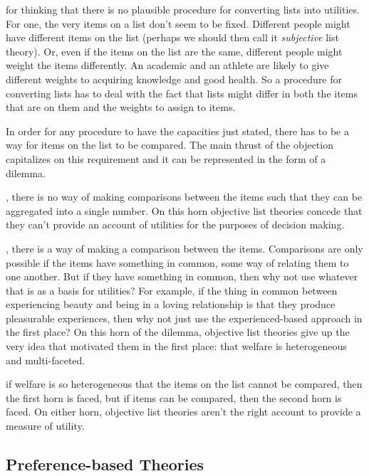 \documentclass[]{tufte-book}
\begin{document}
 for thinking that there is no plausible procedure for converting lists into utilities. For one, the very items on a list don't seem to be fixed. Different people might have different items on the list (perhaps we should then call it \emph{subjective} list theory). Or, even if the items on the list are the same, different people might weight the items differently. An academic and an athlete are likely to give different weights to acquiring knowledge and good health. So a procedure for converting lists has to deal with the fact that lists might differ in both the items that are on them and the weights to assign to items.

In order for any procedure to have the capacities just stated, there has to be a way for items on the list to be compared. The main thrust of the objection capitalizes on this requirement and it can be represented in the form of a dilemma.

, there is no way of making comparisons between the items such that they can be aggregated into a single number. On this horn objective list theories concede that they can't provide an account of utilities for the purposes of decision making.

, there is a way of making a comparison between the items. Comparisons are only possible if the items have something in common, some way of relating them to one another. But if they have something in common, then why not use whatever that is as a basis for utilities? For example, if the thing in common between experiencing beauty and being in a loving relationship is that they produce pleasurable experiences, then why not just use the experienced-based approach in the first place? On this horn of the dilemma, objective list theories give up the very idea that motivated them in the first place: that welfare is heterogeneous and multi-faceted.

 if welfare is so heterogeneous that the items on the list cannot be compared, then the first horn is faced, but if items can be compared, then the second horn is faced. On either horn, objective list theories aren't the right account to provide a measure of utility.

\hypertarget{preference-based-theories}{%
\subsection{Preference-based Theories}\label{preference-based-theories}}
\end{document}

